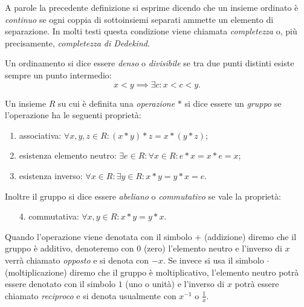 A parole la precedente definizione si esprime dicendo che un insieme ordinato
è \emph{continuo} se ogni coppia di sottoinsiemi separati 
ammette un elemento di separazione.
In molti testi questa condizione viene chiamata \emph{completezza}
o, più precisamente, \emph{completezza di Dedekind}.
%
%

\begin{definition}
  \label{def:ordinamento_denso}%
  Un ordinamento si dice essere
  \emph{denso}%
%
 o \emph{divisibile} 
  se tra due punti distinti esiste sempre un punto intermedio:
  \[
   x < y \implies \exists c \colon x < c < y.
  \]
\end{definition}

\begin{definition}[gruppo]
  \label{def:gruppo}%
  Un insieme $R$ su cui è definita una \emph{operazione} $*$ 
  si dice essere un \emph{gruppo}%
%
 se l'operazione
  ha le seguenti proprietà:
  \begin{enumerate}
    \item associativa: $\forall x,y,z\in R\colon (x*y)*z = x*(y*z)$;
    \item esistenza elemento neutro: 
    $\exists e\in R\colon \forall x\in R \colon e*x=x*e = x$;
    \item esistenza inverso: 
    $\forall x\in R\colon \exists y\in R\colon x*y=y*x=e$.
  \end{enumerate}
  Inoltre il gruppo si dice essere \emph{abeliano}%
%
 o \emph{commutativo}
  se vale la proprietà:
  \begin{enumerate}
    \item[4.] commutativa: $\forall x,y\in R\colon x*y = y*x$.
  \end{enumerate}
  
  Quando l'operazione viene denotata con il simbolo $+$ (addizione)
  diremo che il gruppo è additivo, denoteremo con $0$ 
  (zero) l'elemento neutro e l'inverso di $x$ verrà chiamato \emph{opposto}
  e si denota con $-x$.
  Se invece si usa il simbolo $\cdot$ (moltiplicazione)
  diremo che il gruppo è moltiplicativo, l'elemento neutro potrà 
  essere denotato con il simbolo $1$ (uno o unità) e 
  l'inverso di $x$ potrà essere chiamato \emph{reciproco}
  e si denota usualmente con $x^{-1}$ o $\frac 1 x$.
  \end{definition}
  
